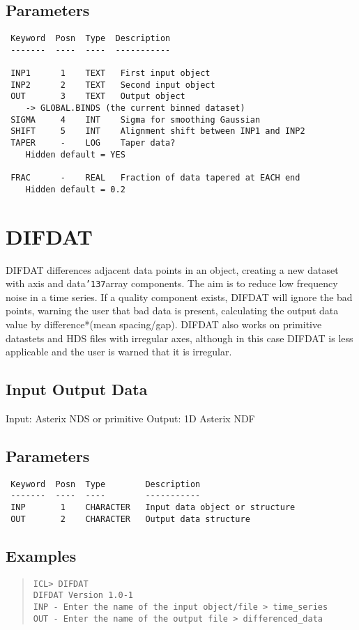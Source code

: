 \documentclass{book}
\renewcommand{\_}{{\tt\char'137}}     %
\begin{document}
\subsection{Parameters}
\begin{verbatim}
 Keyword  Posn  Type  Description
 -------  ----  ----  -----------

 INP1      1    TEXT   First input object
 INP2      2    TEXT   Second input object
 OUT       3    TEXT   Output object
    -> GLOBAL.BINDS (the current binned dataset)
 SIGMA     4    INT    Sigma for smoothing Gaussian
 SHIFT     5    INT    Alignment shift between INP1 and INP2
 TAPER     -    LOG    Taper data?
    Hidden default = YES

 FRAC      -    REAL   Fraction of data tapered at EACH end
    Hidden default = 0.2

\end{verbatim}\section{DIFDAT}
DIFDAT differences adjacent data points in an object, creating
a new dataset with axis and data\_array components. The
aim is to reduce low frequency noise in a time series. If a
quality component exists, DIFDAT will ignore the bad points,
warning the user that bad data is present, calculating the
output data value by difference*(mean spacing/gap). DIFDAT
also works on primitive datastets and HDS files with irregular
axes, although in this case DIFDAT is less applicable and the
user is warned that it is irregular.
\subsection{Input Output Data}
Input: Asterix NDS or primitive
Output: 1D Asterix NDF
\subsection{Parameters}
\begin{verbatim}
 Keyword  Posn  Type        Description
 -------  ----  ----        -----------
 INP       1    CHARACTER   Input data object or structure
 OUT       2    CHARACTER   Output data structure

\end{verbatim}\subsection{Examples}
\begin{quote}\begin{verbatim}
ICL> DIFDAT
DIFDAT Version 1.0-1
INP - Enter the name of the input object/file > time_series
OUT - Enter the name of the output file > differenced_data
\end{verbatim}\end{quote}
\end{document}
